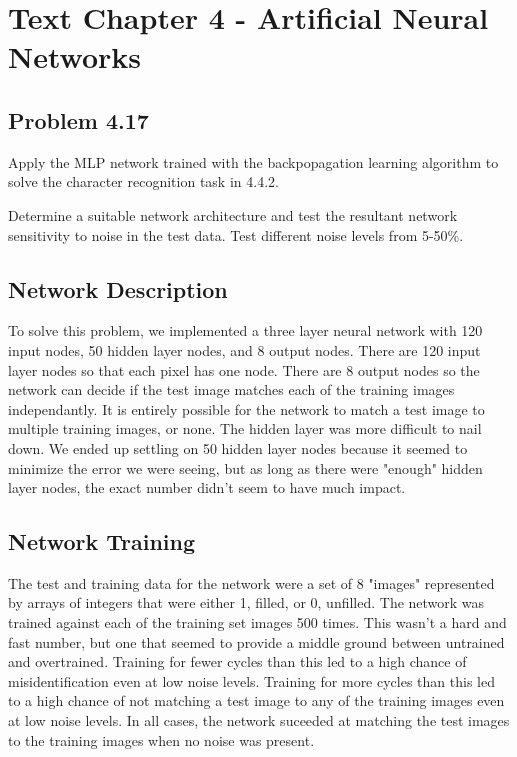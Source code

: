 
\chapter{Text Chapter 4 - Artificial Neural Networks}

\section{Problem 4.17}

Apply the MLP network trained with the backpopagation learning algorithm to solve the character recognition task in 4.4.2.

Determine a suitable network architecture and test the resultant network sensitivity to noise in the test data. Test different noise levels from 5-50\%.

\section{Network Description}

To solve this problem, we implemented a three layer neural network with 120 input nodes, 50 hidden layer nodes, and 8 output nodes. There are 120 input layer nodes so that each pixel has one node. There are 8 output nodes so the network can decide if the test image matches each of the training images independantly. It is entirely possible for the network to match a test image to multiple training images, or none. The hidden layer was more difficult to nail down. We ended up settling on 50 hidden layer nodes because it seemed to minimize the error we were seeing, but as long as there were "enough" hidden layer nodes, the exact number didn't seem to have much impact.

\section{Network Training}

The test and training data for the network were a set of 8 "images" represented by arrays of integers that were either 1, filled, or 0, unfilled. The network was trained against each of  the training set images 500 times. This wasn't a hard and fast number, but one that seemed to provide a middle ground between untrained and overtrained. Training for fewer cycles than this led to a high chance of misidentification even at low noise levels. Training for more cycles than this led to a high chance of not matching a test image to any of the training images even at low noise levels. In all cases, the network suceeded at matching the test images to the training images when no noise was present.

